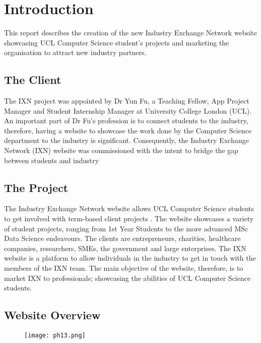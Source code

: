 \hypertarget{introduction}{%
\section{Introduction}\label{introduction}}

This report describes the creation of the new Industry Exchange Network
website showcasing UCL Computer Science student's projects and marketing
the organisation to attract new industry partners.

\hypertarget{the-client}{%
\subsection{The Client}\label{the-client}}

The IXN project was appointed by Dr Yun Fu, a Teaching Fellow, App
Project Manager and Student Internship Manager at University College
London (UCL). An important part of Dr Fu's profession is to connect
students to the industry, therefore, having a website to showcase the
work done by the Computer Science department to the industry is
significant. Consequently, the Industry Exchange Network (IXN) website
was commissioned with the intent to bridge the gap between students and
industry

\hypertarget{the-project}{%
\subsection{The Project}\label{the-project}}

The Industry Exchange Network website allows UCL Computer Science
students to get involved with term-based client projects \cite{g1}. The
website showcases a variety of student projects, ranging from 1st Year
Students to the more advanced MSc Data Science endeavours. The clients
are entrepreneurs, charities, healthcare companies, researchers, SMEs,
the government and large enterprises. The IXN website is a platform to
allow individuals in the industry to get in touch with the members of
the IXN team. The main objective of the website, therefore, is to market
IXN to professionals; showcasing the abilities of UCL Computer Science
students.

\hypertarget{website-overview}{%
\subsection{Website Overview}\label{website-overview}}

\begin{figure}[H]
      \centering
      \texttt{[image: ph13.png]}
 \end{figure}

